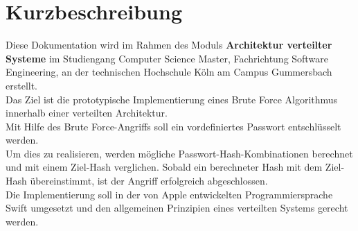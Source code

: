 \chapter*{Kurzbeschreibung}

Diese Dokumentation wird im Rahmen des Moduls \textbf{Architektur verteilter Systeme} im Studiengang Computer Science Master, Fachrichtung Software Engineering, an der technischen Hochschule Köln am Campus Gummersbach erstellt. \\

Das Ziel ist die prototypische Implementierung eines Brute Force Algorithmus innerhalb einer verteilten Architektur.\\
Mit Hilfe des Brute Force-Angriffs soll ein vordefiniertes Passwort entschlüsselt werden. \\
Um dies zu realisieren, werden mögliche Passwort-Hash-Kombinationen berechnet und mit einem Ziel-Hash verglichen. Sobald ein berechneter Hash mit dem Ziel-Hash übereinstimmt, ist der Angriff erfolgreich abgeschlossen. \\

Die Implementierung soll in der von Apple\textsuperscript{\textcopyright} entwickelten Programmiersprache Swift umgesetzt und den allgemeinen Prinzipien eines verteilten Systems gerecht werden. 